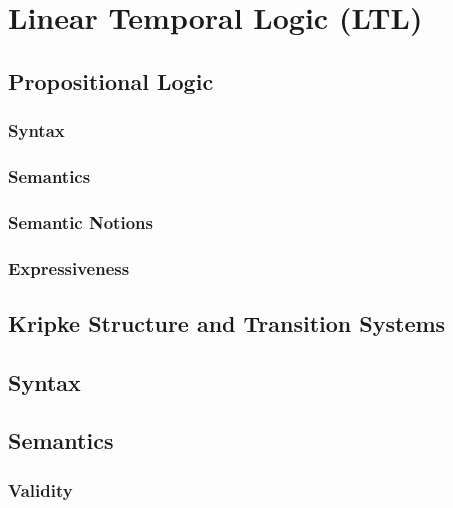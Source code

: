 \documentclass[a4paper, 11pt, accentcolor = tud3b]{tudreport}
\begin{document}
	\chapter{Linear Temporal Logic (LTL)} %

		\section{Propositional Logic} %

			\subsection{Syntax} %

			\subsection{Semantics} %

			\subsection{Semantic Notions} %

			\subsection{Expressiveness} %

		\section{Kripke Structure and Transition Systems} %

		\section{Syntax} %

		\section{Semantics} %

			\subsection{Validity} %
\end{document}
